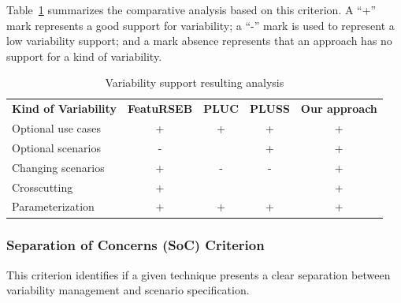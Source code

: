 Table~\ref{tab:crt-01} summarizes the comparative analysis based on
this criterion. A ``+'' mark represents a good support for
variability; a ``-'' mark is used to represent a low variability
support; and a mark absence represents that an approach has no
support for a kind of variability.


\begin{table}[h]
\begin{center}
\caption{Variability support resulting analysis} \label{tab:crt-01}
\begin{tabular}{lcccc}
   \hline\noalign{\smallskip}
  {\bf Kind of Variability} & {\bf FeatuRSEB} & {\bf PLUC} & {\bf PLUSS} & {\bf Our approach} \\
   \noalign{\smallskip}
   \hline
   \noalign{\smallskip}
    Optional use cases    & +     & +     & +     & + \\ 
    Optional scenarios    & -     &       & +     & + \\ 
    Changing scenarios    & +     & -     & -     & + \\ 
    Crosscutting          & +     &       &       & + \\ 
    Parameterization      & +     & +     & +     & + \\ \hline
\end{tabular}
\end{center}
\end{table}




\subsubsection{Separation of Concerns (SoC) Criterion}
This criterion identifies if a given technique presents a clear
separation between variability management and scenario 
specification.

